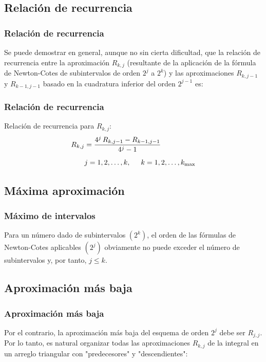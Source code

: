 \subsection*{Relación de recurrencia}
\begin{frame}
\frametitle{Relación de recurrencia}
Se puede demostrar en general, aunque no sin cierta dificultad, que la relación de recurrencia entre la aproximación $R_{k, j}$ (resultante de la aplicación de la fórmula de Newton-Cotes de subintervalos de orden $2^{j}$ a $2^{k}$) y las aproximaciones $R_{k, j-1}$ y $R_{k-1, j-1}$ basado en la cuadratura inferior del orden $2^{j-1}$ es:
\end{frame}
\begin{frame}
\frametitle{Relación de recurrencia}
Relación de recurrencia para $R_{k, j}$:
\begin{align*}
R_{k, j} &= \dfrac{4^{j} \, R_{k, j-1} - R_{k-1, j-1}}{4^{j}-1} \\[0.5em]
&j = 1, 2, \ldots, k, \hspace{0.5cm} k = 1, 2, \ldots,  k_{\max}
\end{align*}
\end{frame}
\subsection*{Máxima aproximación}
\begin{frame}
\frametitle{Máximo de intervalos}
Para un número dado de subintervalos $(2^{k})$, el orden de las fórmulas de Newton-Cotes aplicables $(2^{j})$ obviamente no puede exceder el número de subintervalos y, por tanto, $j \leq k$.
\end{frame}
\subsection*{Aproximación más baja}
\begin{frame}
\frametitle{Aproximación más baja}
Por el contrario, la aproximación más baja del esquema de orden $2^{j}$ debe ser $R_{j, j}$.
\\
\bigskip
Por lo tanto, es natural organizar todas las aproximaciones $R_{k, j}$ de la integral en un arreglo triangular con "predecesores" y "descendientes":
\end{frame}
